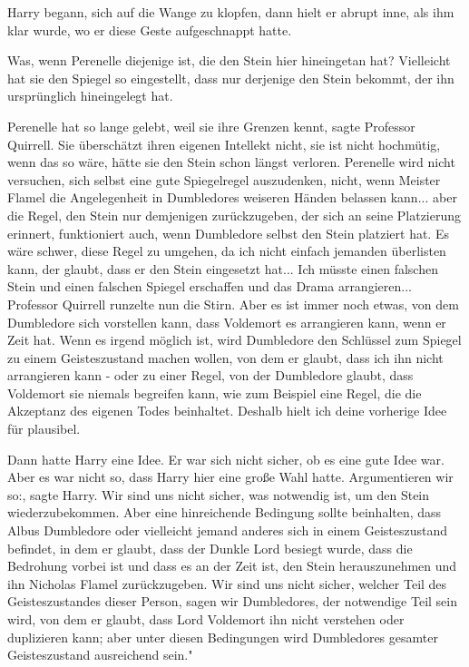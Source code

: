 Harry begann, sich auf die Wange zu klopfen, dann hielt er abrupt inne, als ihm
klar wurde, wo er diese Geste aufgeschnappt hatte.

\glqq{}Was, wenn Perenelle diejenige ist, die den Stein hier hineingetan hat?
Vielleicht hat sie den Spiegel so eingestellt, dass nur derjenige den Stein
bekommt, der ihn ursprünglich hineingelegt hat.\grqq{}

\glqq{}Perenelle hat so lange gelebt, weil sie ihre Grenzen kennt\grqq{}, sagte
Professor Quirrell. \glqq{}Sie überschätzt ihren eigenen Intellekt nicht, sie ist
nicht hochmütig, wenn das so wäre, hätte sie den Stein schon längst verloren.
Perenelle wird nicht versuchen, sich selbst eine gute Spiegelregel auszudenken,
nicht, wenn Meister Flamel die Angelegenheit in Dumbledores weiseren Händen
belassen kann... aber die Regel, den Stein nur demjenigen zurückzugeben, der
sich an seine Platzierung erinnert, funktioniert auch, wenn Dumbledore selbst
den Stein platziert hat. Es wäre schwer, diese Regel zu umgehen, da ich nicht
einfach jemanden überlisten kann, der glaubt, dass er den Stein eingesetzt
hat... Ich müsste einen falschen Stein und einen falschen Spiegel erschaffen und
das Drama arrangieren...\grqq{} Professor Quirrell runzelte nun die Stirn. \glqq{}
Aber es ist immer noch etwas, von dem Dumbledore sich vorstellen kann, dass
Voldemort es arrangieren kann, wenn er Zeit hat. Wenn es irgend möglich ist,
wird Dumbledore den Schlüssel zum Spiegel zu einem Geisteszustand machen wollen,
von dem er glaubt, dass ich ihn nicht arrangieren kann - oder zu einer Regel,
von der Dumbledore glaubt, dass Voldemort sie niemals begreifen kann, wie zum
Beispiel eine Regel, die die Akzeptanz des eigenen Todes beinhaltet. Deshalb
hielt ich deine vorherige Idee für plausibel.\grqq{}

Dann hatte Harry eine Idee. Er war sich nicht sicher, ob es eine gute Idee war.
Aber es war nicht so, dass Harry hier eine große Wahl hatte. \glqq{}Argumentieren
wir so:\grqq{}, sagte Harry. \glqq{}Wir sind uns nicht sicher, was notwendig ist,
um den Stein wiederzubekommen. Aber eine hinreichende Bedingung sollte
beinhalten, dass Albus Dumbledore oder vielleicht jemand anderes sich in einem
Geisteszustand befindet, in dem er glaubt, dass der Dunkle Lord besiegt wurde,
dass die Bedrohung vorbei ist und dass es an der Zeit ist, den Stein
herauszunehmen und ihn Nicholas Flamel zurückzugeben. Wir sind uns nicht sicher,
welcher Teil des Geisteszustandes dieser Person, sagen wir Dumbledores, der
notwendige Teil sein wird, von dem er glaubt, dass Lord Voldemort ihn nicht
verstehen oder duplizieren kann; aber unter diesen Bedingungen wird Dumbledores
gesamter Geisteszustand ausreichend sein."

